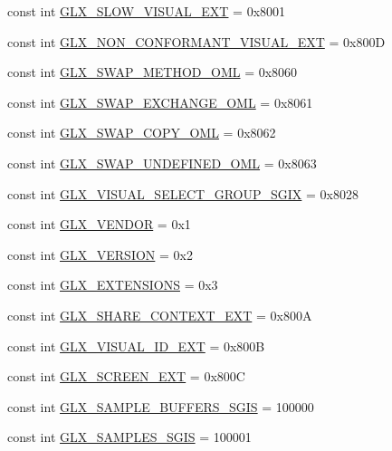 \begin{DoxyCompactItemize}
\item 
const int \hyperlink{class_tao_1_1_platform_1_1_x11_1_1_glx_a6ace1cdea8ca8d0277262bbbdab3208e}{GLX\_\-SLOW\_\-VISUAL\_\-EXT} = 0x8001
\item 
const int \hyperlink{class_tao_1_1_platform_1_1_x11_1_1_glx_af52ed35e6d62a6b15c0b1c8146f39325}{GLX\_\-NON\_\-CONFORMANT\_\-VISUAL\_\-EXT} = 0x800D
\item 
const int \hyperlink{class_tao_1_1_platform_1_1_x11_1_1_glx_aa3a152fce38aec49cf836f6cea9ad5d6}{GLX\_\-SWAP\_\-METHOD\_\-OML} = 0x8060
\item 
const int \hyperlink{class_tao_1_1_platform_1_1_x11_1_1_glx_a7867fdb981fbefbb0f4cc4ec47d5451b}{GLX\_\-SWAP\_\-EXCHANGE\_\-OML} = 0x8061
\item 
const int \hyperlink{class_tao_1_1_platform_1_1_x11_1_1_glx_a70d4f7954350861ad0d71ed03e300b33}{GLX\_\-SWAP\_\-COPY\_\-OML} = 0x8062
\item 
const int \hyperlink{class_tao_1_1_platform_1_1_x11_1_1_glx_ac0b3ee6aa931dd05a099b72bd433d664}{GLX\_\-SWAP\_\-UNDEFINED\_\-OML} = 0x8063
\item 
const int \hyperlink{class_tao_1_1_platform_1_1_x11_1_1_glx_a2893e772610e2ca4b80c46216137bef2}{GLX\_\-VISUAL\_\-SELECT\_\-GROUP\_\-SGIX} = 0x8028
\item 
const int \hyperlink{class_tao_1_1_platform_1_1_x11_1_1_glx_a1a8d04f2c9ed80340eb6ddae62962c65}{GLX\_\-VENDOR} = 0x1
\item 
const int \hyperlink{class_tao_1_1_platform_1_1_x11_1_1_glx_ae1c13229f4b03607ede1ec39f5fdfade}{GLX\_\-VERSION} = 0x2
\item 
const int \hyperlink{class_tao_1_1_platform_1_1_x11_1_1_glx_aa98e7ad8e8c05de7ed45f2578b86b280}{GLX\_\-EXTENSIONS} = 0x3
\item 
const int \hyperlink{class_tao_1_1_platform_1_1_x11_1_1_glx_a1d7d422f83455ebe81d6d69f850d5033}{GLX\_\-SHARE\_\-CONTEXT\_\-EXT} = 0x800A
\item 
const int \hyperlink{class_tao_1_1_platform_1_1_x11_1_1_glx_a50a7a17fed6da4d8691aec98b882ad16}{GLX\_\-VISUAL\_\-ID\_\-EXT} = 0x800B
\item 
const int \hyperlink{class_tao_1_1_platform_1_1_x11_1_1_glx_a7f97f97f95eddfb79e1ae39032c98a7f}{GLX\_\-SCREEN\_\-EXT} = 0x800C
\item 
const int \hyperlink{class_tao_1_1_platform_1_1_x11_1_1_glx_aa93523144cfdbd8382aa99383205c17d}{GLX\_\-SAMPLE\_\-BUFFERS\_\-SGIS} = 100000
\item 
const int \hyperlink{class_tao_1_1_platform_1_1_x11_1_1_glx_acbb6099d7e93d979f469e8f4e74d908f}{GLX\_\-SAMPLES\_\-SGIS} = 100001

\end{DoxyCompactItemize}
